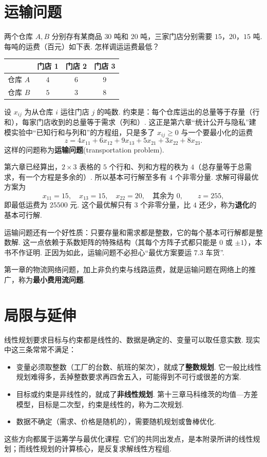 \section{运输问题}\label{app:or-transport}

\begin{example}\label{eg:or-transport}
	两个仓库 $A,B$ 分别存有某商品 $30$ 吨和 $20$ 吨，三家门店分别需要 $15$，$20$，$15$ 吨. 每吨的运费（百元）如下表. 怎样调运运费最低？
	\begin{center}
		\begin{tabular}{cccc}
			\toprule
			& 门店 1 & 门店 2 & 门店 3 \\
			\midrule
			仓库 $A$ & $4$ & $6$ & $9$ \\
			仓库 $B$ & $5$ & $3$ & $8$ \\
			\bottomrule
		\end{tabular}
	\end{center}
\end{example}

设 $x_{ij}$ 为从仓库 $i$ 运往门店 $j$ 的吨数. 约束是：每个仓库运出的总量等于存量（行和），每家门店收到的总量等于需求（列和）. 这正是第六章“统计公开与隐私”建模实验中“已知行和与列和”的方程组，只是多了 $x_{ij}\ge0$ 与一个要最小化的运费
\[z=4x_{11}+6x_{12}+9x_{13}+5x_{21}+3x_{22}+8x_{23}.\]
这样的问题称为\textbf{运输问题}(transportation problem).

第六章已经算出，$2\times3$ 表格的 $5$ 个行和、列和方程的秩为 $4$（总存量等于总需求，有一个方程是多余的）. 所以基本可行解至多有 $4$ 个非零分量. 求解可得最优方案为
\[x_{11}=15,\quad x_{13}=15,\quad x_{22}=20,\quad\text{其余为 }0,\qquad z=255,\]
即最低运费为 $25500$ 元. 这个最优解只有 $3$ 个非零分量，比 $4$ 还少，称为\textbf{退化}的基本可行解.

运输问题还有一个好性质：只要存量和需求都是整数，它的每个基本可行解都是整数解. 这一点依赖于系数矩阵的特殊结构（其每个方阵子式都只能是 $0$ 或 $\pm1$），本书不作证明. 正因为如此，运输问题不必担心“最优方案要运 $7.3$ 车货”.

第一章的物流网络问题，加上非负约束与线路运费，就是运输问题在网络上的推广，称为\textbf{最小费用流问题}.

\section{局限与延伸}

线性规划要求目标与约束都是线性的、数据是确定的、变量可以取任意实数. 现实中这三条常常不满足：
\begin{itemize}
	\item 变量必须取整数（工厂的台数、航班的架次），就成了\textbf{整数规划}. 它一般比线性规划难得多，丢掉整数要求再四舍五入，可能得到不可行或很差的方案.
	\item 目标或约束是非线性的，就成了\textbf{非线性规划}. 第十三章马科维茨的均值—方差模型，目标是二次型，约束是线性的，称为二次规划.
	\item 数据不确定（需求、价格是随机的），需要随机规划或鲁棒优化.
\end{itemize}
这些方向都属于运筹学与最优化课程. 它们的共同出发点，是本附录所讲的线性规划；而线性规划的计算核心，是反复求解线性方程组.

